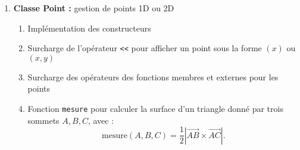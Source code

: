 \documentclass{article}
\begin{document}
    \begin{enumerate}[label=\arabic*]
        \item \textbf{Classe Point :} gestion de points 1D ou 2D
        \begin{enumerate}[label=\alph*.]
            \item Implémentation des constructeurs
            \item Surcharge de l'opérateur \texttt{<<} pour afficher un point sous la forme \((x)\) ou \((x, y)\)
            \item Surcharge des opérateurs des fonctions membres et externes pour les points
            \item Fonction \texttt{mesure} pour calculer la surface d'un triangle donné par trois sommets \(A, B, C\), avec :
                \[
                \text{mesure}(A, B, C) = \frac{1}{2} |\overrightarrow{AB} \times \overrightarrow{AC}|.
                \]
        \end{enumerate}


\end{enumerate}
\end{document}
